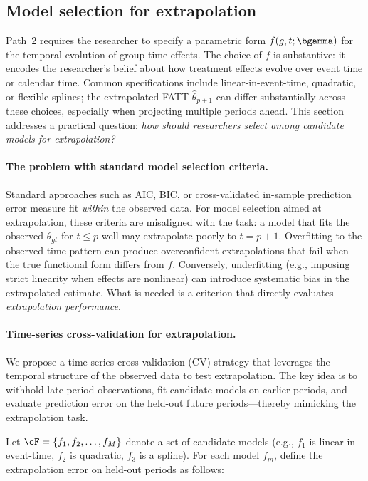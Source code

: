 \subsection{Model selection for extrapolation}\label{sec:model-selection}

Path~2 requires the researcher to specify a parametric form $f(g,t;\bgamma)$ for the temporal evolution of group-time effects. The choice of $f$ is substantive: it encodes the researcher's belief about how treatment effects evolve over event time or calendar time. Common specifications include linear-in-event-time, quadratic, or flexible splines; the extrapolated FATT $\widehat{\theta}_{p+1}$ can differ substantially across these choices, especially when projecting multiple periods ahead. This section addresses a practical question: \emph{how should researchers select among candidate models for extrapolation?}

\paragraph{The problem with standard model selection criteria.}
Standard approaches such as AIC, BIC, or cross-validated in-sample prediction error measure fit \emph{within} the observed data. For model selection aimed at extrapolation, these criteria are misaligned with the task: a model that fits the observed $\theta_{gt}$ for $t \leq p$ well may extrapolate poorly to $t = p+1$. Overfitting to the observed time pattern can produce overconfident extrapolations that fail when the true functional form differs from $f$. Conversely, underfitting (e.g., imposing strict linearity when effects are nonlinear) can introduce systematic bias in the extrapolated estimate. What is needed is a criterion that directly evaluates \emph{extrapolation performance}.

\paragraph{Time-series cross-validation for extrapolation.}
We propose a time-series cross-validation (CV) strategy that leverages the temporal structure of the observed data to test extrapolation. The key idea is to withhold late-period observations, fit candidate models on earlier periods, and evaluate prediction error on the held-out future periods---thereby mimicking the extrapolation task.

Let $\cF = \{f_1, f_2, \ldots, f_M\}$ denote a set of candidate models (e.g., $f_1$ is linear-in-event-time, $f_2$ is quadratic, $f_3$ is a spline). For each model $f_m$, define the extrapolation error on held-out periods as follows:

